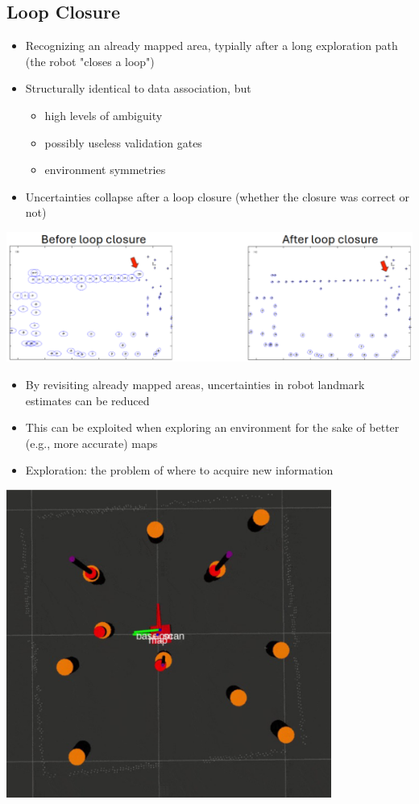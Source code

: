 \documentclass[10pt]{article}
\begin{document}
\subsection*{Loop Closure}
\begin{itemize}
	\item Recognizing an already mapped area, typially after a long exploration path (the robot "closes a loop")
	\item Structurally identical to data association, but
	\begin{itemize}
        \item high levels of ambiguity
        \item possibly useless validation gates
        \item environment symmetries
    \end{itemize}
    \item Uncertainties collapse after a loop closure (whether the closure was correct or not)
\end{itemize}
\begin{center} 
	\includegraphics*[width=\textwidth]{L2_18.png} 
\end{center}
\begin{itemize}
	\item By revisiting already mapped areas, uncertainties in robot landmark estimates can be reduced
	\item This can be exploited when exploring an environment for the sake of better (e.g., more accurate) maps
	\item Exploration: the problem of where to acquire new information
\end{itemize}
\begin{center} 
	\includegraphics*[width=0.8\textwidth]{L2_19.png} 
\end{center}
\end{document}
